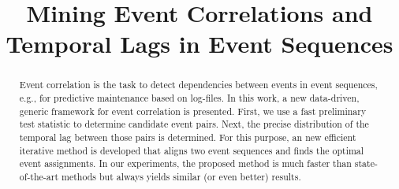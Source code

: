 \documentclass[conference]{IEEEtran}
\theoremstyle{examplestyle}
\begin{document}
\begin{acronym}
\end{acronym}





\title{Mining Event Correlations and Temporal Lags in Event Sequences}


\author{
\and
{}
}
 



\maketitle


\begin{abstract}
Event correlation is the task to detect dependencies between events in event sequences, e.g., for predictive maintenance based on log-files.
In this work, a new data-driven, generic framework for event correlation is presented. 
First, we use a fast preliminary test statistic to determine candidate event pairs. Next, the precise distribution of the temporal lag between those pairs is determined. 
For this purpose, an new efficient iterative method is developed  that aligns two event sequences and finds the optimal  event assignments.
In our experiments, the proposed method is much faster than state-of-the-art methods but always yields similar (or even better) results. 
\end{abstract}






\IEEEpeerreviewmaketitle
\end{document}
